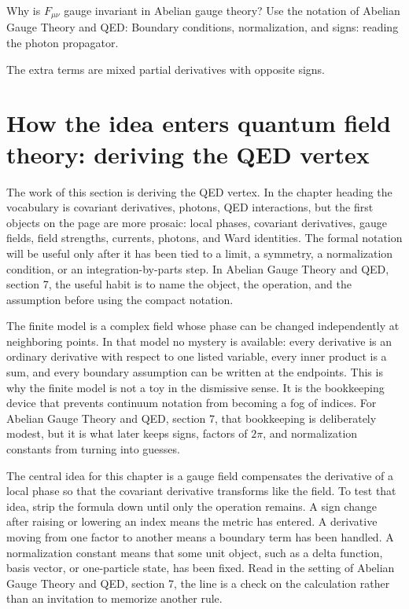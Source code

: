 \begin{exercise}
Why is \(F_{\mu\nu}\) gauge invariant in Abelian gauge theory?  Use the notation of Abelian Gauge Theory and QED: Boundary conditions, normalization, and signs: reading the photon propagator.
\begin{answer}
The extra terms are mixed partial derivatives with opposite signs.
\end{answer}
\end{exercise}



\section{How the idea enters quantum field theory: deriving the QED vertex}

The work of this section is deriving the QED vertex.  In the chapter heading the vocabulary is covariant derivatives, photons, QED interactions, but the first objects on the page are more prosaic: local phases, covariant derivatives, gauge fields, field strengths, currents, photons, and Ward identities.  The formal notation will be useful only after it has been tied to a limit, a symmetry, a normalization condition, or an integration-by-parts step.  In Abelian Gauge Theory and QED, section 7, the useful habit is to name the object, the operation, and the assumption before using the compact notation.

The finite model is a complex field whose phase can be changed independently at neighboring points.  In that model no mystery is available: every derivative is an ordinary derivative with respect to one listed variable, every inner product is a sum, and every boundary assumption can be written at the endpoints.  This is why the finite model is not a toy in the dismissive sense.  It is the bookkeeping device that prevents continuum notation from becoming a fog of indices.  For Abelian Gauge Theory and QED, section 7, that bookkeeping is deliberately modest, but it is what later keeps signs, factors of \(2\pi\), and normalization constants from turning into guesses.

The central idea for this chapter is a gauge field compensates the derivative of a local phase so that the covariant derivative transforms like the field.  To test that idea, strip the formula down until only the operation remains.  A sign change after raising or lowering an index means the metric has entered.  A derivative moving from one factor to another means a boundary term has been handled.  A normalization constant means that some unit object, such as a delta function, basis vector, or one-particle state, has been fixed.  Read in the setting of Abelian Gauge Theory and QED, section 7, the line is a check on the calculation rather than an invitation to memorize another rule.

